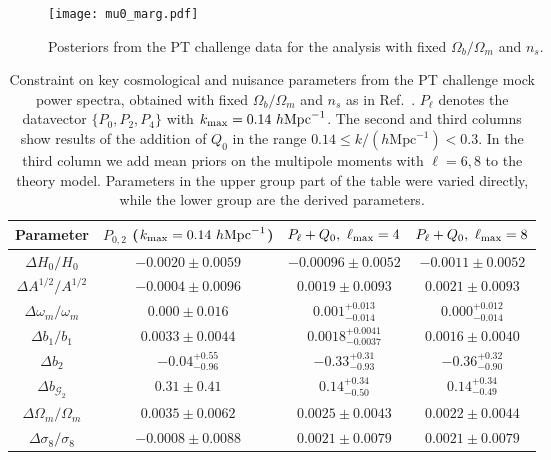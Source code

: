 \documentclass[12pt,a4paper]{article}
\newcommand\hMpc{h\text{Mpc}^{-1}}
\newcommand{\kmax}{k_{\rm max}}
\newcommand{\lmax}{\ell_{\rm max}}
\begin{document}
\begin{figure*}[htb!]
\centering
 \texttt{[image: mu0\_marg.pdf]}
    \caption{Posteriors from the PT challenge data for the analysis with fixed $\Omega_b/\Omega_m$ and $n_s$.
    }
    \label{fig:mu0}
\end{figure*}
\begin{table*}[ht!]
\begin{center}
  \begin{tabular}{|c||c|c|c|} \hline
   Parameter   &  $P_{0,2}$  ($\kmax=0.14~\hMpc$)
   &  $P_{\ell}+Q_0,~\lmax=4$  
   &  $P_{\ell}+Q_0,~\lmax=8$
      \\ [0.2cm]
      \hline 
$\Delta H_0/H_0$    & $-0.0020\pm 0.0059  $
& $-0.00096\pm 0.0052$  
& $-0.0011\pm 0.0052 $\\ \hline
$\Delta A^{1/2}/A^{1/2}$   & $-0.0004\pm 0.0096 $
& $0.0019\pm 0.0093 $
& $0.0021\pm 0.0093 $
\\ 
\hline
     $\Delta\omega_{m}/\omega_{m}$  &
$0.000\pm 0.016$
  & $0.001^{+0.013}_{-0.014}$
  & $0.000^{+0.012}_{-0.014}$
   \\  \hline
$\Delta b_1/b_1$   & $0.0033\pm 0.0044   $
& $0.0018^{+0.0041}_{-0.0037} $
& $0.0016\pm 0.0040   $
\\ 
\hline
$\Delta b_2$   & $-0.04^{+0.55}_{-0.96} $
& $-0.33^{+0.31}_{-0.93} $
& $-0.36^{+0.32}_{-0.90}$
\\ 
\hline
$\Delta b_{\mathcal{G}_2}$   & $0.31\pm 0.41  $
& $0.14^{+0.34}_{-0.50}  $
& $0.14^{+0.34}_{-0.49} $
\\ 
   \hline \hline 
$\Delta\Omega_m/\Omega_m$   & $0.0035\pm 0.0062 $
& $0.0025\pm 0.0043 $
& $0.0022\pm 0.0044  $\\ \hline
$\Delta\sigma_8/\sigma_8$   
& $-0.0008\pm 0.0088$
&$0.0021\pm 0.0079$ 
&$0.0021\pm 0.0079 $ \\ 
\hline
\end{tabular}
\caption{Constraint on key cosmological and nuisance parameters from the PT challenge mock power spectra, obtained with fixed $\Omega_b/\Omega_{m}$ and $n_s$ as in Ref.~\cite{Nishimichi:2020tvu}.
$P_\ell$ denotes the datavector $\{P_0,P_2,P_4\}$ with $\kmax=0.14~\hMpc$. The second and third columns 
show results of the addition of $Q_0$ in the range $0.14\leq k/(\hMpc)<0.3$. In the third column we add mean priors on 
the multipole moments with $\ell=6,8$ to the theory model.
Parameters in the upper group part of the table
were varied directly, while the lower group
are the derived parameters.
}
\label{tab:fb}
\end{center}
\end{table*}
\end{document}
